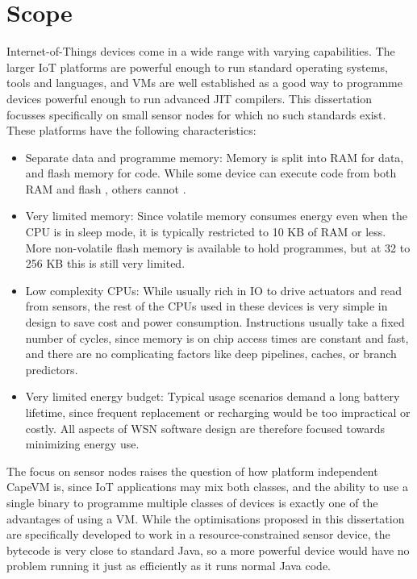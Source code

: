 \section{Scope}
\label{sec-introduction-scope}
Internet-of-Things devices come in a wide range with varying capabilities. The larger IoT platforms are powerful enough to run standard operating systems, tools and languages, and VMs are well established as a good way to programme devices powerful enough to run advanced JIT compilers. This dissertation focusses specifically on small sensor nodes for which no such standards exist. These platforms have the following characteristics:
\begin{itemize}
    \item Separate data and programme memory: Memory is split into RAM for data, and flash memory for code. While some device can execute code from both RAM and flash \cite{TexasInstrumentsIncorporated:MSP430F1611Datasheet}, others cannot \cite{Atmel:ATmega128Datasheet}.
    \item Very limited memory: Since volatile memory consumes energy even when the CPU is in sleep mode, it is typically restricted to 10 KB of RAM or less. More non-volatile flash memory is available to hold programmes, but at 32 to 256 KB this is still very limited.
    \item Low complexity CPUs: While usually rich in IO to drive actuators and read from sensors, the rest of the CPUs used in these devices is very simple in design to save cost and power consumption. Instructions usually take a fixed number of cycles, since memory is on chip access times are constant and fast, and there are no complicating factors like deep pipelines, caches, or branch predictors.
    \item Very limited energy budget: Typical usage scenarios demand a long battery lifetime, since frequent replacement or recharging would be too impractical or costly. All aspects of WSN software design are therefore focused towards minimizing energy use.
\end{itemize}

The focus on sensor nodes raises the question of how platform independent CapeVM is, since IoT applications may mix both classes, and the ability to use a single binary to programme multiple classes of devices is exactly one of the advantages of using a VM. While the optimisations proposed in this dissertation are specifically developed to work in a resource-constrained sensor device, the bytecode is very close to standard Java, so a more powerful device would have no problem running it just as efficiently as it runs normal Java code.


